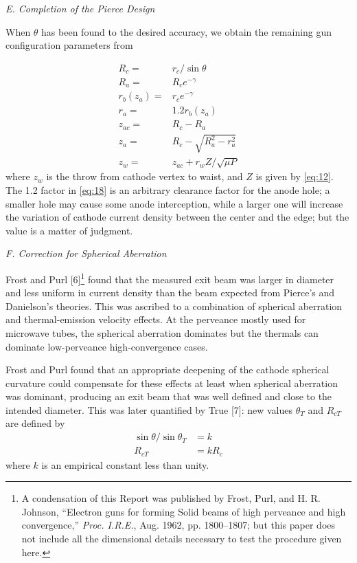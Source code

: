 \documentclass[10pt,a4paper,UTF8,fleqn]{article}
\begin{document}
\vspace{2ex}\textit{E. Completion of the Pierce Design}\vspace{0.5ex}


When $ \theta $ has been found to the desired accuracy, we obtain the remaining gun configuration parameters from

\begin{align}
	R_c = &r_c/\sin\theta \label{eq:15}\\
	R_a = &R_ce^{-\gamma} \label{eq:16}\\
	r_b(z_a) = &r_c e^{-\gamma} \label{eq:17}\\
	r_a = &1.2r_b(z_a) \label{eq:18}\\
	z_{ac} = &R_c - R_a \label{eq:19}\\
	z_a = & R_c - \sqrt{R_a^2 - r_a^2} \label{eq:20} \\
	z_w = & z_{ac} + r_w Z/\sqrt{\mu P} \label{eq:21}
\end{align}
where $ z_w $ is the throw from cathode vertex to waist, and $ Z $ is given by \eqref{eq:12}. The 1.2 factor in \eqref{eq:18} is an arbitrary clearance factor for the anode hole; a smaller hole may cause some anode interception, while a larger one will increase the variation of cathode current density between the center and the edge; but the value is a matter of judgment.

\vspace{1ex}\textit{F. Correction for Spherical Aberration}\vspace{1ex}

 Frost and Purl [6]\footnote{A condensation of this Report was published by Frost, Purl, and H. R. Johnson, ``Electron guns for forming Solid beams of high perveance and high convergence,'' \textit{Proc. I.R.E.}, Aug. 1962, pp. 1800--1807; but this paper does not include all the dimensional details necessary to test the procedure given here.} found that the measured exit beam was larger in diameter and less uniform in current density than the beam expected from Pierce's and Danielson's theories. This was ascribed to a combination of spherical aberration and thermal-emission velocity effects. At the perveance mostly used for microwave tubes, the spherical aberration dominates but the thermals can dominate low-perveance high-convergence cases.
 
Frost and Purl found that an appropriate deepening of the cathode spherical curvature could compensate for these effects at least when spherical aberration was dominant, producing an exit beam that was well defined and close to the intended diameter. This was later quantified by True [7]: new values $\theta_T $ and $ R_{cT} $ are defined by
\begin{align}
	\sin\theta/\sin\theta_T &= k\label{eq:22}\\R_{cT} &= kR_c\label{eq:23}
\end{align}
where $ k $ is an empirical constant less than unity.
\end{document}
